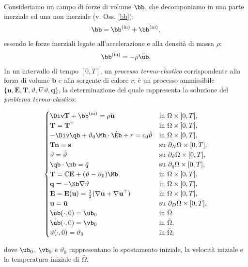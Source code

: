 Consideriamo un campo di forze di volume $\bb$, che decomponiamo in  una parte inerziale ed una non inerziale (v. Oss. \ref{bb}):
	\begin{equation}
		\bb =\bb^{({\rm in})}+\bb^{({\rm ni})},
	\end{equation}
	essendo le forze inerziali legate all'accelerazione e alla densità di massa $\rho$:
	\begin{equation}
		\bb^{({\rm in})}=-\rho \ddot{\ub}.
	\end{equation}
In un intervallo di tempo $[0,T]$, un \textit{ processo termo-elastico} corrispondente alla forza di volume \( \mathbf{b} \) e alla sorgente di calore \( r \), è un processo ammissibile \( \{ \mathbf{u}, \mathbf{E}, \mathbf{T}, \vartheta, \nabla\vartheta, \mathbf{q} \}\), la determinazione del quale rappresenta la soluzione del \textit{problema termo-elastico}:
\begin{definition}
	\begin{equation}
		\begin{cases}
			\Div\mathbf{T}+\bb^{({\rm ni})}=\rho \ddot{\mathbf{u}}&\mathrm{in~}\Omega\times[0,T],\\
			\mathbf{T}=\mathbf{T}^\top&\mathrm{in~}\Omega\times[0,T],\\
			-\Div \qb +\vartheta_0 \Mb \cdot \dot \Eb+r=c_0\dot\vartheta &\mathrm{in~}\Omega\times[0,T],\\
			\mathbf{T}\mathbf{n}=\mathbf{s}&\mathrm{su~}\partial_{N}\Omega\times[0,T],\\
			\vartheta=\bar{\vartheta}&\mathrm{su~}\partial_{\vartheta}\Omega\times[0,T],\\
			\qb\cdot \nb=\bar{q} &\mathrm{su~}\partial_{q}\Omega\times[0,T],\\
			\mathbf{T}=\mathbb{C}\mathbf{E}+(\vartheta-\vartheta_0)\Mb&\mathrm{in~}\Omega\times[0,T],\\
			\mathbf{q}=-\Kb \nabla\vartheta&\mathrm{in~}\Omega\times[0,T],\\
			\mathbf{E}=\mathbf{E}(\mathbf{u})=\frac{1}{2}(\nabla\mathbf{u}+\nabla\mathbf{u}^\top)&\mathrm{in~}\Omega\times[0,T],\\
			\mathbf{u}=\bar{\mathbf{u}}&\mathrm{su~}\partial_{D}\Omega\times[0,T],\\
			\ub(\cdot, 0)=\ub_0		&\mathrm{in~}\bar\Omega \\
			\dot\ub(\cdot, 0)=\vb_0		&\mathrm{in~}\bar\Omega,\\
			\vartheta(\cdot, 0)=\vartheta_0	&\mathrm{in~}\bar\Omega;
		\end{cases}
	\end{equation}
\end{definition}
dove $\ub_0$, $\vb_0$ e $\vartheta_0$ rappresentano lo spostamento iniziale, la velocità iniziale e la temperatura iniziale di $\bar{\Omega}$.

